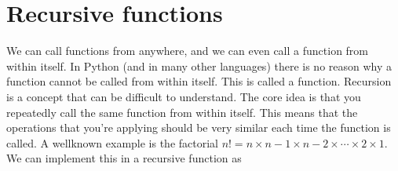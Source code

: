 \documentclass[letterpaper,10pt,english]{jupyterBook}
\begin{document}
\section{Recursive functions}
\label{\detokenize{notebooks/04_Functions/04_Functions_student:recursive-functions}}
\sphinxAtStartPar
We can call functions from anywhere, and we can even call a function from within itself. In Python (and in many other languages) there is no reason why a function cannot be called from within itself. This is called a  function. Recursion is a concept that can be difficult to understand. The core idea is that you repeatedly call the same function from within itself. This means that the operations that you’re applying should be very similar each time the function is called. A well\sphinxhyphen{}known example is the factorial \(n!=n \times n-1 \times n-2 \times \cdots \times 2 \times 1\). We can implement this in a recursive function as
\end{document}
